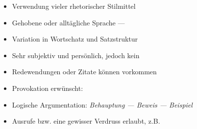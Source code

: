 \begin{itemize}

	\item Verwendung vieler rhetorischer Stilmittel

	\item Gehobene oder allt\"{a}gliche Sprache --- 

	\item Variation in Wortschatz und Satzstruktur

	\item Sehr subjektiv und pers\"{o}nlich, jedoch kein 

	\item Redewendungen oder Zitate k\"{o}nnen vorkommen

	\item Provokation erw\"{u}nscht: 

	\item Logische Argumentation: \emph{Behauptung --- Beweis --- Beispiel}

	\item Ausrufe bzw. eine gewisser Verdruss erlaubt, z.B. 

\end{itemize}

